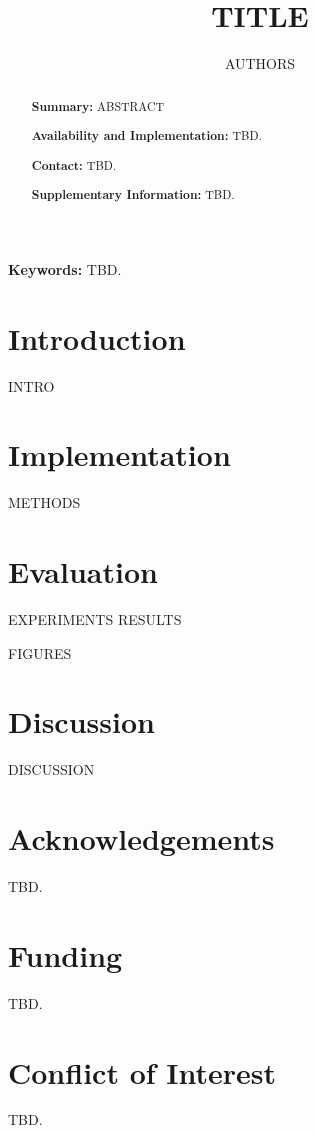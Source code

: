 \documentclass[10pt,twocolumn]{article}
\title{{{TITLE}}} %
\author{{{AUTHORS}}}
\begin{document}
\maketitle

\begin{abstract}
\noindent\textbf{Summary:} {ABSTRACT}

\noindent\textbf{Availability and Implementation:} TBD. %

\noindent\textbf{Contact:} TBD.

\noindent\textbf{Supplementary Information:} TBD.
\end{abstract}

\textbf{Keywords:} TBD.

\section{Introduction}
{INTRO}

\section{Implementation}
{METHODS}

\section{Evaluation}
{EXPERIMENTS}
{RESULTS}

{FIGURES}

\section{Discussion}
{DISCUSSION}

\section*{Acknowledgements}
TBD.

\section*{Funding}
TBD. %

\section*{Conflict of Interest}
TBD.


\end{document}
